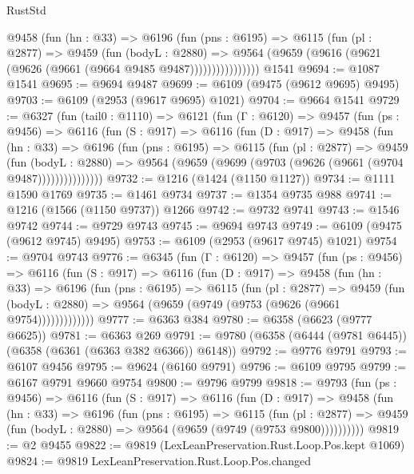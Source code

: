 \begin{lexlean}{RustStd}
\begin{coremodule}
              @9458
                (fun (hn : @33) =>
                @6196
                  (fun (pns : @6195) =>
                  @6115
                    (fun (pl : @2877) =>
                    @9459
                      (fun (bodyL : @2880) =>
                      @9564 (@9659 (@9616 (@9621 (@9626 (@9661 (@9664 @9485 @9487))))))))))))))))
    @1541
@9694 := @1087 @1541
@9695 := @9694 @9487
@9699 := @6109 (@9475 (@9612 @9695) @9495)
@9703 := @6109 (@2953 (@9617 @9695) @1021)
@9704 := @9664 @1541
@9729 := @6327
    (fun (tail0 : @1110) =>
    @6121
      (fun (Γ : @6120) =>
      @9457
        (fun (ps : @9456) =>
        @6116
          (fun (S : @917) =>
          @6116
            (fun (D : @917) =>
            @9458
              (fun (hn : @33) =>
              @6196
                (fun (pns : @6195) =>
                @6115
                  (fun (pl : @2877) =>
                  @9459
                    (fun (bodyL : @2880) =>
                    @9564 (@9659 (@9699 (@9703 (@9626 (@9661 (@9704 @9487)))))))))))))))
@9732 := @1216 (@1424 (@1150 @1127))
@9734 := @1111 @1590 @1769
@9735 := @1461 @9734
@9737 := @1354 @9735 @988
@9741 := @1216 (@1566 (@1150 @9737)) @1266
@9742 := @9732 @9741
@9743 := @1546 @9742
@9744 := @9729 @9743
@9745 := @9694 @9743
@9749 := @6109 (@9475 (@9612 @9745) @9495)
@9753 := @6109 (@2953 (@9617 @9745) @1021)
@9754 := @9704 @9743
@9776 := @6345
    (fun (Γ : @6120) =>
    @9457
      (fun (ps : @9456) =>
      @6116
        (fun (S : @917) =>
        @6116
          (fun (D : @917) =>
          @9458
            (fun (hn : @33) =>
            @6196
              (fun (pns : @6195) =>
              @6115
                (fun (pl : @2877) =>
                @9459
                  (fun (bodyL : @2880) =>
                  @9564 (@9659 (@9749 (@9753 (@9626 (@9661 @9754)))))))))))))
@9777 := @6363 @384
@9780 := @6358 (@6623 (@9777 @6625))
@9781 := @6363 @269
@9791 := @9780 (@6358 (@6444 (@9781 @6445)) (@6358 (@6361 (@6363 @382 @6366)) @6148))
@9792 := @9776 @9791
@9793 := @6107 @9456
@9795 := @9624 (@6160 @9791)
@9796 := @6109 @9795
@9799 := @6167 @9791 @9660 @9754
@9800 := @9796 @9799
@9818 := @9793
    (fun (ps : @9456) =>
    @6116
      (fun (S : @917) =>
      @6116
        (fun (D : @917) =>
        @9458
          (fun (hn : @33) =>
          @6196
            (fun (pns : @6195) =>
            @6115
              (fun (pl : @2877) =>
              @9459 (fun (bodyL : @2880) => @9564 (@9659 (@9749 (@9753 @9800))))))))))
@9819 := @2 @9455
@9822 := @9819 (LexLeanPreservation.Rust.Loop.Pos.kept @1069)
@9824 := @9819 LexLeanPreservation.Rust.Loop.Pos.changed

\end{coremodule}
\end{lexlean}
